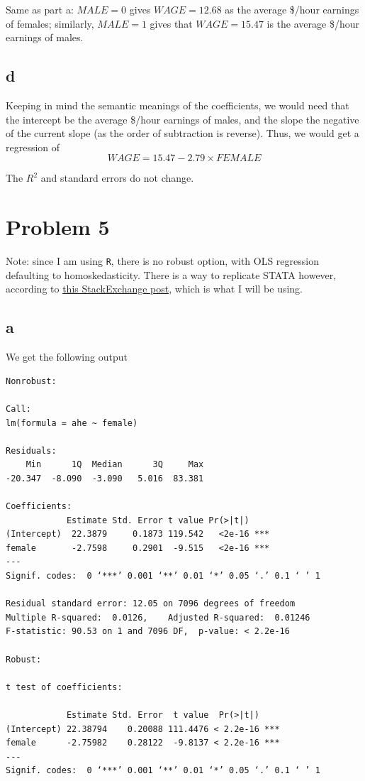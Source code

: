 \documentclass[12pt,letterpaper]{article}
\theoremstyle{definition}
\begin{document}
Same as part a: \(MALE = 0\) gives \(WAGE = 12.68\) as the average \$/hour earnings of females; similarly, \(MALE=1\) gives that \(WAGE = 15.47\) is the average \$/hour earnings of males.

\subsection*{d}

Keeping in mind the semantic meanings of the coefficients, we would need that the intercept be the average \$/hour earnings of males, and the slope the negative of the current slope (as the order of subtraction is reverse). Thus, we would get a regression of
\[
  WAGE = 15.47 - 2.79 \times FEMALE
\]

The $R^{2}$ and standard errors do not change.

\section*{Problem 5}

Note: since I am using \verb|R|, there is no robust option, with OLS regression defaulting to homoskedasticity. There is a way to replicate STATA however, according to \href{https://stats.stackexchange.com/questions/117052/replicating-statas-robust-option-in-r/117066#117066}{this StackExchange post}, which is what I will be using.

\subsection*{a}

We get the following output
\begin{Verbatim}[fontsize=\small]
Nonrobust:

Call:
lm(formula = ahe ~ female)

Residuals:
    Min      1Q  Median      3Q     Max
-20.347  -8.090  -3.090   5.016  83.381

Coefficients:
            Estimate Std. Error t value Pr(>|t|)
(Intercept)  22.3879     0.1873 119.542   <2e-16 ***
female       -2.7598     0.2901  -9.515   <2e-16 ***
---
Signif. codes:  0 ‘***’ 0.001 ‘**’ 0.01 ‘*’ 0.05 ‘.’ 0.1 ‘ ’ 1

Residual standard error: 12.05 on 7096 degrees of freedom
Multiple R-squared:  0.0126,	Adjusted R-squared:  0.01246
F-statistic: 90.53 on 1 and 7096 DF,  p-value: < 2.2e-16

Robust:

t test of coefficients:

            Estimate Std. Error  t value  Pr(>|t|)
(Intercept) 22.38794    0.20088 111.4476 < 2.2e-16 ***
female      -2.75982    0.28122  -9.8137 < 2.2e-16 ***
---
Signif. codes:  0 ‘***’ 0.001 ‘**’ 0.01 ‘*’ 0.05 ‘.’ 0.1 ‘ ’ 1
\end{Verbatim}
\end{document}
